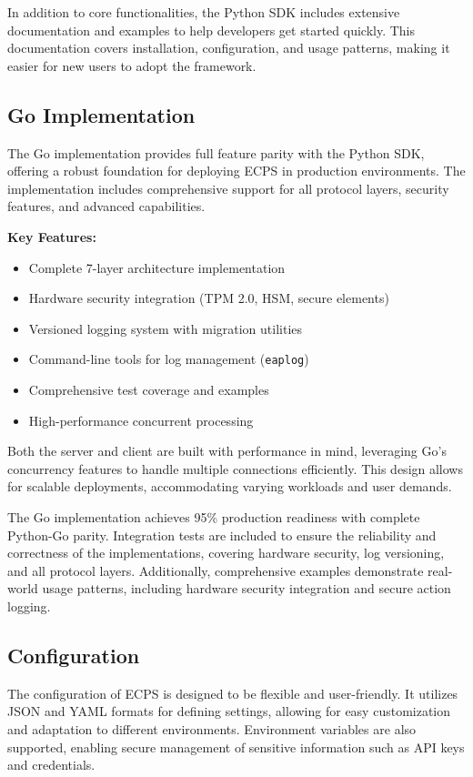 \documentclass[12pt]{article}
\begin{document}
In addition to core functionalities, the Python SDK includes extensive documentation and examples to help developers get started quickly. This documentation covers installation, configuration, and usage patterns, making it easier for new users to adopt the framework.

\subsection{Go Implementation}
The Go implementation provides full feature parity with the Python SDK, offering a robust foundation for deploying ECPS in production environments. The implementation includes comprehensive support for all protocol layers, security features, and advanced capabilities.

\textbf{Key Features:}
\begin{itemize}
  \item Complete 7-layer architecture implementation
  \item Hardware security integration (TPM 2.0, HSM, secure elements)
  \item Versioned logging system with migration utilities
  \item Command-line tools for log management (\texttt{eaplog})
  \item Comprehensive test coverage and examples
  \item High-performance concurrent processing
\end{itemize}

Both the server and client are built with performance in mind, leveraging Go's concurrency features to handle multiple connections efficiently. This design allows for scalable deployments, accommodating varying workloads and user demands.

The Go implementation achieves 95\% production readiness with complete Python-Go parity. Integration tests are included to ensure the reliability and correctness of the implementations, covering hardware security, log versioning, and all protocol layers. Additionally, comprehensive examples demonstrate real-world usage patterns, including hardware security integration and secure action logging.

\subsection{Configuration}
The configuration of ECPS is designed to be flexible and user-friendly. It utilizes JSON and YAML formats for defining settings, allowing for easy customization and adaptation to different environments. Environment variables are also supported, enabling secure management of sensitive information such as API keys and credentials.
\end{document}
